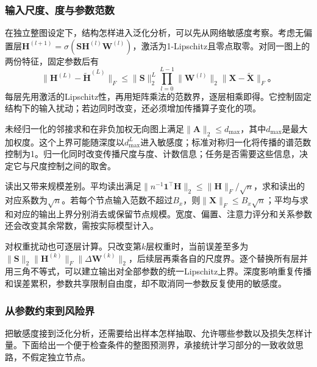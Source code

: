 \subsubsection{输入尺度、度与参数范数}
\label{sec:gnn-norm-generalization}

在独立整图设定下，结构怎样进入泛化分析，可以先从网络敏感度考察。考虑无偏置层$\bm{H}^{(l+1)}=\sigma(\bm{S}\bm{H}^{(l)}\bm{W}^{(l)})$，激活为1-Lipschitz且零点取零。对同一图上的两份特征，固定参数后有
\begin{equation}
  \lVert\bm{H}^{(L)}-\widetilde{\bm{H}}^{(L)}\rVert_F
    \leq\lVert\bm{S}\rVert_2^L
      \prod_{l=0}^{L-1}\lVert\bm{W}^{(l)}\rVert_2
      \lVert\bm{X}-\widetilde{\bm{X}}\rVert_F\text{。}
  \label{eq:gnn-feature-sensitivity}
\end{equation}
每层先用激活的Lipschitz性，再用矩阵乘法的范数界，逐层相乘即得。它控制固定结构下的输入扰动；若边同时改变，还必须增加传播算子变化的项。

未经归一化的邻接求和在非负加权无向图上满足$\lVert\bm{A}\rVert_2\leq d_{\max}$，其中$d_{\max}$是最大加权度。这个上界可能随深度以$d_{\max}^L$进入敏感度；标准对称归一化将传播的谱范数控制为1。归一化同时改变传播尺度与度、计数信息；任务是否需要这些信息，决定它与尺度控制之间的取舍。

读出又带来规模差别。平均读出满足$\lVert n^{-1}\bm{1}^{\top}\bm{H}\rVert_2\leq\lVert\bm{H}\rVert_F/\sqrt n$，求和读出的对应系数为$\sqrt n$。若每个节点输入范数不超过$B_x$，则$\lVert\bm{X}\rVert_F\leq B_x\sqrt n$；平均与求和对应的输出上界分别消去或保留节点规模。宽度、偏置、注意力评分和关系参数还会改变其余常数，需按实际模型计入。

对权重扰动也可逐层计算。只改变第$k$层权重时，当前误差至多为$\lVert\bm{S}\rVert_2\lVert\bm{H}^{(k)}\rVert_F\lVert\Delta\bm{W}^{(k)}\rVert_2$，后续层再乘各自的尺度界。逐个替换所有层并用三角不等式，可以建立输出对全部参数的统一Lipschitz上界。深度影响重复传播和误差累积，参数共享限制自由度，却不取消同一参数反复使用的敏感度。

\subsubsection{从参数约束到风险界}
\label{sec:gnn-risk-bound}

把敏感度接到泛化分析，还需要给出样本怎样抽取、允许哪些参数以及损失怎样计量。下面给出一个便于检查条件的整图预测界，承接统计学习部分的一致收敛思路，不假定独立节点。

